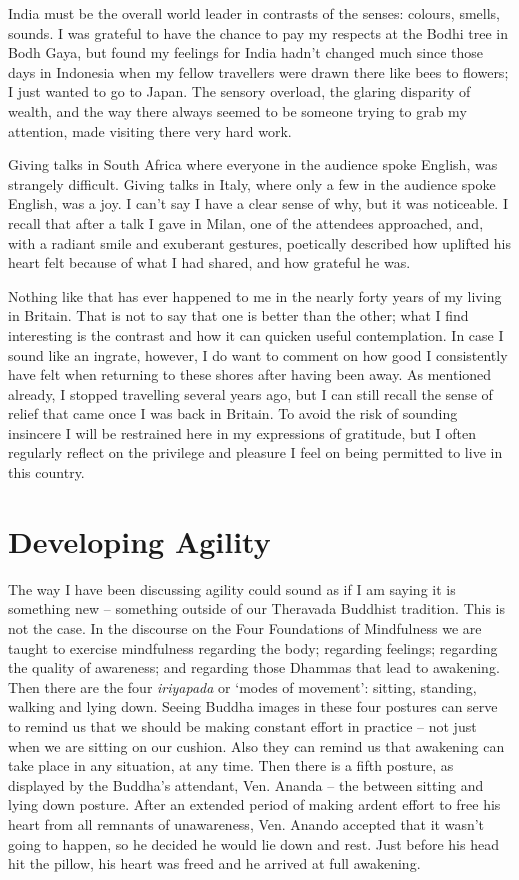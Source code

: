 India must be the overall world leader in contrasts of the senses:
colours, smells, sounds. I was grateful to have the chance to pay my
respects at the Bodhi tree in Bodh Gaya, but found my feelings for India
hadn't changed much since those days in Indonesia when my fellow
travellers were drawn there like bees to flowers; I just wanted
to go to Japan. The sensory overload, the glaring disparity of wealth,
and the way there always seemed to be someone trying to grab my
attention, made visiting there very hard work.

Giving talks in South Africa where everyone in the audience spoke
English, was strangely difficult. Giving talks in Italy, where only a
few in the audience spoke English, was a joy. I can't say I have a clear
sense of why, but it was noticeable. I recall that after a talk I gave
in Milan, one of the attendees approached, and, with a radiant smile and
exuberant gestures, poetically described how uplifted his heart felt
because of what I had shared, and how grateful he was.

Nothing like that has ever happened to me in the nearly forty years of
my living in Britain. That is not to say that one is better than the
other; what I find interesting is the contrast and how it can quicken
useful contemplation. In case I sound like an ingrate, however, I do
want to comment on how good I consistently have felt when returning to
these shores after having been away. As mentioned already, I stopped
travelling several years ago, but I can still recall the sense of relief
that came once I was back in Britain. To avoid the risk of sounding
insincere I will be restrained here in my expressions of gratitude, but
I often regularly reflect on the privilege and pleasure I feel on being
permitted to live in this country.

\section{Developing Agility}

The way I have been discussing agility could sound as if I am saying it
is something new -- something outside of our Theravada Buddhist
tradition. This is not the case. In the discourse on the Four
Foundations of Mindfulness we are taught to exercise mindfulness
regarding the body; regarding feelings; regarding the quality of
awareness; and regarding those Dhammas that lead to awakening. Then
there are the four \emph{iriyapada} or `modes of movement': sitting,
standing, walking and lying down. Seeing Buddha images in these four
postures can serve to remind us that we should be making constant effort
in practice -- not just when we are sitting on our cushion. Also they
can remind us that awakening can take place in any situation, at any
time. Then there is a fifth posture, as displayed by the Buddha's
attendant, Ven. Ananda -- the between sitting and lying down posture.
After an extended period of making ardent effort to free his heart from
all remnants of unawareness, Ven. Anando accepted that it wasn't going
to happen, so he decided he would lie down and rest. Just before his
head hit the pillow, his heart was freed and he arrived at full
awakening.

